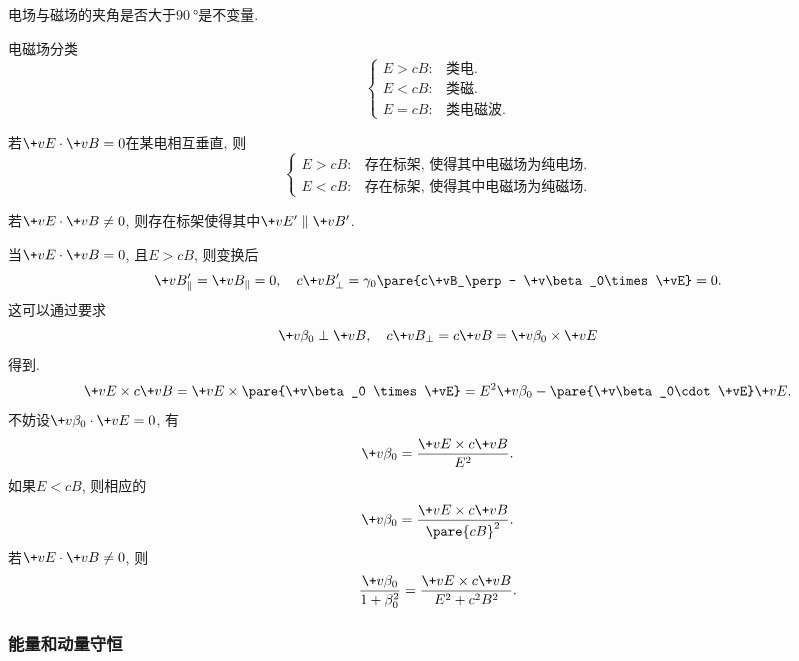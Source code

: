 \documentclass[hidelinks]{ctexart}
\begin{document}
\begin{cenum}
    \item 电场与磁场的夹角是否大于$\SI{90}{\degree}$是不变量.
    \item 电磁场分类
    \[ \begin{cases}
        E>cB: &\text{类电}.\\
        E<cB: &\text{类磁}.\\
        E=cB: &\text{类电磁波}.
    \end{cases} \]
    \item 若$\+vE \cdot \+vB = 0$在某电相互垂直, 则
    \[ \begin{cases}
        E > cB: & \text{存在标架, 使得其中电磁场为纯电场}.\\
        E < cB: & \text{存在标架, 使得其中电磁场为纯磁场}.
    \end{cases} \]
    \item 若$\+vE\cdot \+vB \neq 0$, 则存在标架使得其中$\+vE' \parallel \+vB'$.
\end{cenum}
\begin{ex}
    当$\+vE\cdot \+vB = 0$, 且$E > cB$, 则变换后
    \[ \+vB'_\parallel = \+vB_\parallel = 0,\quad c\+vB'_\perp = \gamma_0 \pare{c\+vB_\perp - \+v\beta_0\times \+vE} = 0. \]
    这可以通过要求
    \[ \+v\beta_0 \perp \+vB,\quad c\+vB_\perp = c\+vB = \+v\beta_0 \times \+vE \]
    得到.
    \[ \+vE\times c\+vB = \+vE\times \pare{\+v\beta_0 \times \+vE} = E^2 \+v\beta_0 - \pare{\+v\beta_0\cdot \+vE}\+vE. \]
    不妨设$\+v\beta_0 \cdot \+vE = 0$, 有
    \[ \+v\beta_0 = \frac{\+vE\times c\+vB}{E^2}. \]
    如果$E<cB$, 则相应的
    \[ \+v\beta_0 = \frac{\+vE\times c\+vB}{\pare{cB}^2}. \]
    若$\+vE\cdot \+vB\neq 0$, 则
    \[ \frac{\+v\beta_0}{1+\beta_0^2} = \frac{\+vE\times c\+vB}{E^2 + c^2B^2}. \]
\end{ex}


\subsubsection{能量和动量守恒} %
\label{ssub:能量和动量守恒}
\end{document}
